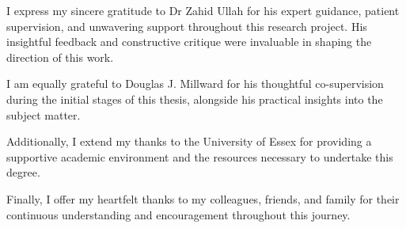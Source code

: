 I express my sincere gratitude to Dr Zahid Ullah for his expert guidance, patient supervision, and unwavering support throughout this research project. His insightful feedback and constructive critique were invaluable in shaping the direction of this work.

I am equally grateful to Douglas J. Millward for his thoughtful co-supervision during the initial stages of this thesis, alongside his practical insights into the subject matter.

Additionally, I extend my thanks to the University of Essex for providing a supportive academic environment and the resources necessary to undertake this degree.

Finally, I offer my heartfelt thanks to my colleagues, friends, and family for their continuous understanding and encouragement throughout this journey.
